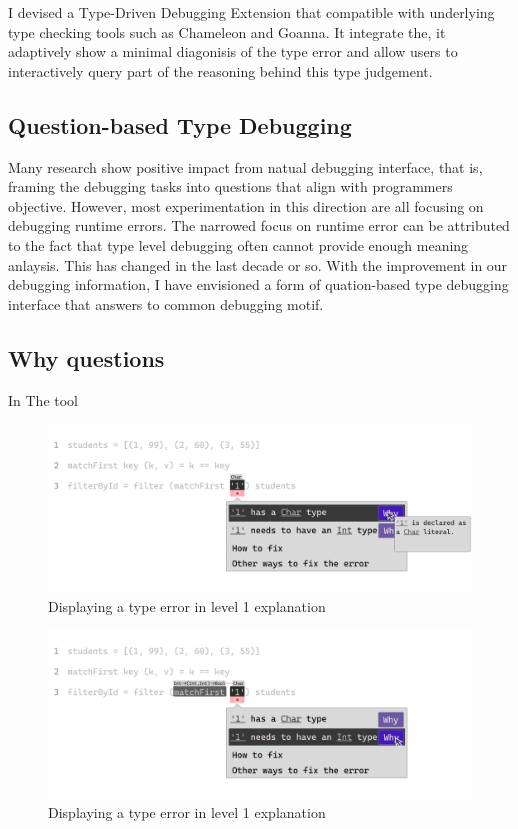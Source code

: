 I devised a Type-Driven Debugging Extension that compatible with underlying type checking tools such as Chameleon and Goanna.  It integrate the, it adaptively show a minimal diagonisis of the type error and allow users to interactively query part of the reasoning behind this type judgement.  

\subsection{Question-based Type Debugging}
Many research show positive impact from natual debugging interface, that is,  framing the debugging tasks into questions that align with programmers objective. However, most experimentation in this direction are all focusing on debugging runtime errors. The narrowed focus on runtime error can be attributed to the fact that type level debugging often cannot provide enough meaning anlaysis. This has changed in the last decade or so. With the improvement in our debugging information, I have envisioned a form of quation-based type debugging interface that answers to common debugging motif. 

\subsection{Why questions}
In The tool
\begin{figure}[hbt]
  \includegraphics[width=\linewidth]{ExplainError1.pdf}
  \caption{
      Displaying a type error in level 1 explanation
    }
\end{figure}


\begin{figure}[hbt]
  \includegraphics[width=\linewidth]{ExplainError2.pdf}
  \caption{
      Displaying a type error in level 1 explanation
    }
\end{figure}


